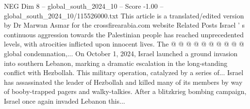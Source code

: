\begin{textsample}{NEG Dim 8 – global\_south\_2024\_10 – Score -1.00 – global\_south\_2024\_10/115526000.txt}
This article is a translated/edited version by Dr Marwan Asmar for the crossfirearabia.com website Related Posts Israel ' s continuous aggression towards the Palestinian people has reached unprecedented levels, with atrocities inflicted upon innocent lives.
The @ @ @ @ @ @ @ @ @ @ global condemnation,...
On October 1, 2024, Israel launched a ground invasion into southern Lebanon, marking a dramatic escalation in the long-standing conflict with Hezbollah.
This military operation, catalyzed by a series of...
Israel has assassinated the leader of Hezbollah and killed many of its members by way of booby-trapped pagers and walky-talkies.
After a blitzkrieg bombing campaign, Israel once again invaded Lebanon this...

\end{textsample}
